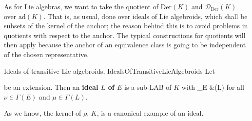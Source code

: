 As for Lie algebras, we want to take the quotient of $\mathrm{Der}(K)$ and $\mathcal{D}_{\mathrm{Der}}(K)$ over $\mathrm{ad}(K)$. That is, as usual, done over ideals of Lie algebroids, which shall be subsets of the kernel of the anchor; the reason behind this is to avoid problems in quotients with respect to the anchor. The typical constructions for quotients will then apply because the anchor of an equivalence class is going to be independent of the chosen representative.

\begin{definitions}{Ideals of transitive Lie algebroids, \newline \cite[Definition 6.5.6; page 250]{mackenzieGeneralTheory}}{IdealsOfTransitiveLieAlgebroids}
Let
\begin{center}
\end{center}
be an extension. Then an \textbf{ideal $L$ of $E$} is a sub-LAB of $K$ with
\ba
\mleft[ \nu, \mu \mright]_E &\in \Gamma(L)
\ea
for all $\nu \in \Gamma(E)$ and $\mu \in \Gamma(L)$.
\end{definitions}

\begin{remark}
\leavevmode\newline
As we know, the kernel of $\rho$, $K$, is a canonical example of an ideal.
\end{remark}

